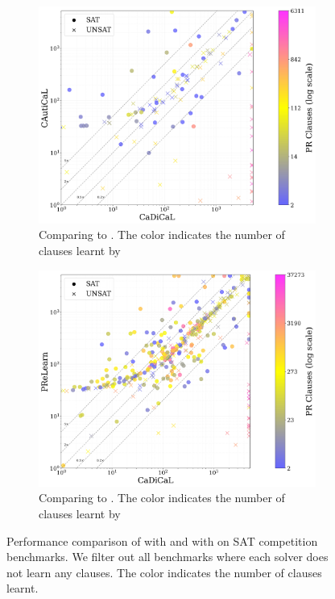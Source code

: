 \begin{figure}[!t]
    \centering
    \begin{subfigure}[t]{0.45\textwidth}
        \centering
        \includegraphics[width=\textwidth]{figs/cadical_vs_cautical_nontrivial.jpg}
        \caption{Comparing \tool to \cadical. The color indicates the number of \pr clauses learnt by \tool}
        \label{subfig:cautical-vs-cadical-satcomp}
    \end{subfigure}
    \hspace{0.06\textwidth}
    \begin{subfigure}[t]{0.45\textwidth}
        \centering
        \includegraphics[width=\textwidth]{figs/cadical_vs_prelearn_nontrivial.jpg}
        \caption{Comparing \prelearn to \cadical. The color indicates the number of \pr clauses learnt by \prelearn}
        \label{subfig:cautical-vs-prelearn-satcomp}
    \end{subfigure}
    \caption{Performance comparison of \tool with and \prelearn with \cadical on SAT competition benchmarks. We filter out all benchmarks where each solver does not learn any \pr clauses. The color indicates the number of \pr clauses learnt.}
    \label{fig:solver-comparison}
\end{figure}

